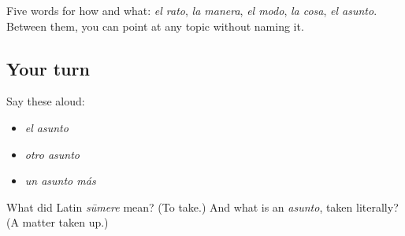 \begin{grammarlens}[title={What you've built}]
Five words for how and what: \emph{el rato}, \emph{la manera}, \emph{el modo}, \emph{la cosa}, \emph{el asunto}. Between them, you can point at any topic without naming it.
\end{grammarlens}

\subsection*{Your turn}
Say these aloud:

\begin{itemize}
\raggedright
  \item \emph{el asunto}
  \item \emph{otro asunto}
  \item \emph{un asunto más}
\end{itemize}

\begin{tcolorbox}[breakable,colback=teal!4,colframe=teal!35!black,title={Before you move on}]
What did Latin \emph{sūmere} mean? (To take.) And what is an \emph{asunto}, taken literally? (A matter taken up.)
\end{tcolorbox}
